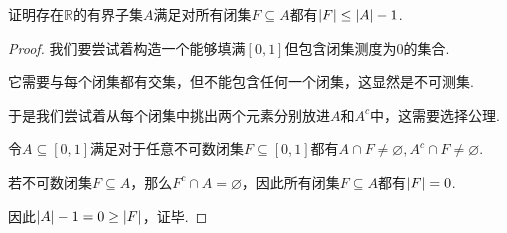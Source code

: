 \begin{problem}[2]\label{2.D.2}
    证明存在\(\mathbb{R}\)的有界子集\(A\)满足对所有闭集\(F \subseteq A\)都有\(\abs*{F} \leq \abs*{A}-1\).
\end{problem}

\begin{proof}
    {\kaishu 我们要尝试着构造一个能够填满\([0,1]\)但包含闭集测度为\(0\)的集合.
    
    它需要与每个闭集都有交集，但不能包含任何一个闭集，这显然是不可测集.
    
    于是我们尝试着从每个闭集中挑出两个元素分别放进\(A\)和\(A^c\)中，这需要选择公理.}

    令\(A \subseteq [0,1]\)满足对于任意不可数闭集\(F \subseteq [0,1]\)都有\(A \cap F \ne \varnothing, A^c \cap F \ne \varnothing\).

    若不可数闭集\(F \subseteq A\)，那么\(F^c \cap A=\varnothing\)，因此所有闭集\(F \subseteq A\)都有\(\abs*{F}=0\).

    因此\(\abs*{A}-1=0 \geq \abs*{F}\)，证毕.
\end{proof}

\begin{comment}
    \begin{problem}[3]\label{2.D.3}
        证明存在\(\mathbb{R}\)的子集\(A\)满足对所有开集\(G \subseteq A\)都有\(\abs*{G \setminus A}=\infty\).
    \end{problem}

    \begin{proof}
        {\kaishu 和上题一样，我们要构造一个不可测集，但是切割对象换成了所有开区间.}

        令\(A \subseteq \mathbb{R}\)满足对于任意开区间\(I \subseteq \mathbb{R}\)都有\(A \cap I \ne \varnothing, A^c \cap I \ne \varnothing\).

        显然任何包含\(A\)的开集只能是\(\mathbb{R}\)，且\(\abs*{G \setminus A}=\infty\).
    \end{proof}
\end{comment}


